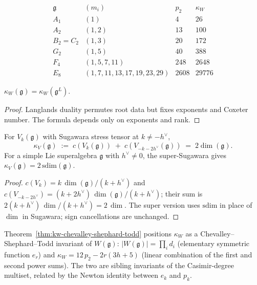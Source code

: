 \documentclass[11pt]{article}
\begin{document}
\begin{example}
\label{ex:kw-values}
\[
\begin{array}{lccl}
\mathfrak{g} & (m_i) & p_2 & \kappa_W \\[2pt]
A_1 & (1) & 4 & 26 \\
A_2 & (1, 2) & 13 & 100 \\
B_2 = C_2 & (1, 3) & 20 & 172 \\
G_2 & (1, 5) & 40 & 388 \\
F_4 & (1, 5, 7, 11) & 248 & 2648 \\
E_8 & (1, 7, 11, 13, 17, 19, 23, 29) & 2608 & 29776
\end{array}
\]
\end{example}

\begin{corollary}
$\kappa_W(\mathfrak{g}) = \kappa_W(\mathfrak{g}^L)$.
\end{corollary}

\begin{proof}
Langlands duality permutes root data but fixes exponents and Coxeter
number. The formula depends only on exponents and rank.
\end{proof}

\begin{theorem}
\label{thm:kv-universal}
For $V_k(\mathfrak{g})$ with Sugawara stress tensor at
$k \ne -h^{\vee}$,
\[
  \kappa_V(\mathfrak{g})
  \;:=\;
  c(V_k(\mathfrak{g}))
  \;+\;
  c(V_{-k-2h^{\vee}}(\mathfrak{g}))
  \;=\;
  2 \dim(\mathfrak{g}).
\]
For a simple Lie superalgebra $\mathfrak{g}$ with $h^{\vee} \ne 0$,
the super-Sugawara gives $\kappa_V(\mathfrak{g}) = 2\,\mathrm{sdim}(\mathfrak{g})$.
\end{theorem}

\begin{proof}
$c(V_k) = k\,\dim(\mathfrak{g})/(k+h^{\vee})$ and
$c(V_{-k-2h^{\vee}}) = (k + 2h^{\vee})\,\dim(\mathfrak{g})/(k+h^{\vee})$;
their sum is $2(k + h^{\vee})\,\dim/(k+h^{\vee}) = 2\,\dim$. The super
version uses $\mathrm{sdim}$ in place of $\dim$ in Sugawara;
sign cancellations are unchanged.
\end{proof}

\begin{remark}
Theorem~\ref{thm:kw-chevalley-shephard-todd} positions
$\kappa_W$ as a Chevalley--Shephard--Todd invariant of
$W(\mathfrak{g})$: $|W(\mathfrak{g})| = \prod_i d_i$ (elementary
symmetric function $e_r$) and $\kappa_W = 12\,p_2 - 2r(3h+5)$
(linear combination of the first and second power sums). The
two are sibling invariants of the Casimir-degree multiset,
related by the Newton identity between $e_k$ and $p_k$.
\end{remark}
\end{document}
